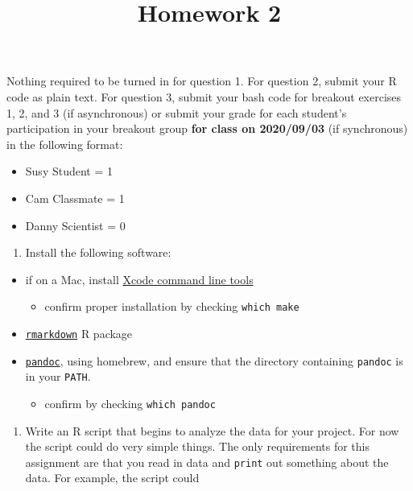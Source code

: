 \documentclass[]{article}
\title{Homework 2}
\author{}
\date{\vspace{-2.5em}}
\providecommand{\tightlist}{%
  \setlength{\itemsep}{0pt}\setlength{\parskip}{0pt}}
\begin{document}
\maketitle

Nothing required to be turned in for question 1. For question 2, submit
your R code as plain text. For question 3, submit your bash code for
breakout exercises 1, 2, and 3 (if asynchronous) or submit your grade
for each student's participation in your breakout group \textbf{for
class on 2020/09/03} (if synchronous) in the following format:

\begin{itemize}
\tightlist
\item
  Susy Student = 1
\item
  Cam Classmate = 1
\item
  Danny Scientist = 0
\end{itemize}

\begin{enumerate}
\def\labelenumi{\arabic{enumi}.}
\tightlist
\item
  Install the following software:
\end{enumerate}

\begin{itemize}
\tightlist
\item
  if on a Mac, install
  \href{http://railsapps.github.io/xcode-command-line-tools.html}{Xcode
  command line tools}

  \begin{itemize}
  \tightlist
  \item
    confirm proper installation by checking \texttt{which\ make}
  \end{itemize}
\item
  \href{https://cran.r-project.org/web/packages/rmarkdown/index.html}{\texttt{rmarkdown}}
  R package
\item
  \href{https://pandoc.org/installing.html}{\texttt{pandoc}}, using
  homebrew, and ensure that the directory containing \texttt{pandoc} is
  in your \texttt{PATH}.

  \begin{itemize}
  \tightlist
  \item
    confirm by checking \texttt{which\ pandoc}
  \end{itemize}
\end{itemize}

\begin{enumerate}
\def\labelenumi{\arabic{enumi}.}
\setcounter{enumi}{1}
\tightlist
\item
  Write an R script that begins to analyze the data for your project.
  For now the script could do very simple things. The only requirements
  for this assignment are that you read in data and \texttt{print} out
  something about the data. For example, the script could
\end{enumerate}
\end{document}
